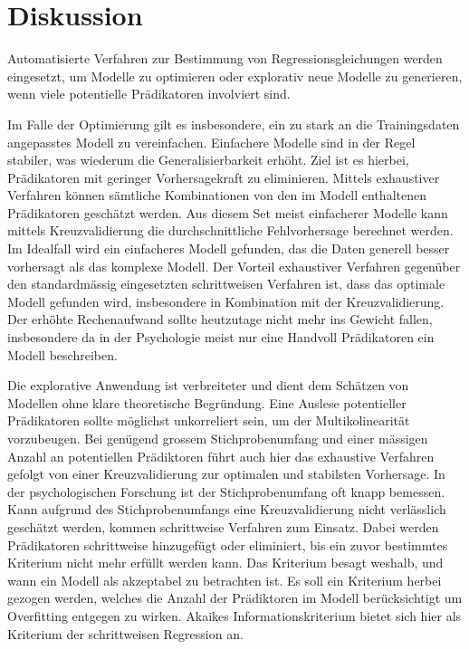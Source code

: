 \section{Diskussion}
Automatisierte Verfahren zur Bestimmung von Regressionsgleichungen werden eingesetzt, um Modelle zu optimieren oder explorativ neue Modelle zu generieren, wenn viele potentielle Prädikatoren involviert sind. 

Im Falle der Optimierung gilt es insbesondere, ein zu stark an die Trainingsdaten angepasstes Modell zu vereinfachen. 
Einfachere Modelle sind in der Regel stabiler, was wiederum die Generalisierbarkeit erhöht.
Ziel ist es hierbei, Prädikatoren mit geringer Vorhersagekraft zu eliminieren. Mittels exhaustiver Verfahren können sämtliche Kombinationen von den im Modell enthaltenen Prädikatoren geschätzt werden.
Aus diesem Set meist einfacherer Modelle kann mittels Kreuzvalidierung die durchschnittliche Fehlvorhersage berechnet werden. Im Idealfall wird ein einfacheres Modell gefunden, das die Daten generell besser vorhersagt als das komplexe Modell.
Der Vorteil exhaustiver Verfahren gegenüber den standardmässig eingesetzten schrittweisen Verfahren ist, dass das optimale Modell gefunden wird, insbesondere in Kombination mit der Kreuzvalidierung.
Der erhöhte Rechenaufwand sollte heutzutage nicht mehr ins Gewicht fallen, insbesondere da in der Psychologie meist nur eine Handvoll Prädikatoren ein Modell beschreiben.  

Die explorative Anwendung ist verbreiteter und dient dem Schätzen von Modellen ohne klare theoretische Begründung.
Eine Auslese potentieller Prädikatoren sollte möglichst unkorreliert sein, um der Multikolinearität vorzubeugen. Bei genügend grossem Stichprobenumfang und einer mässigen Anzahl an potentiellen Prädiktoren führt auch hier das exhaustive Verfahren gefolgt von einer Kreuzvalidierung zur optimalen und stabilsten Vorhersage. In der psychologischen Forschung ist der Stichprobenumfang oft knapp bemessen. Kann aufgrund des Stichprobenumfangs eine Kreuzvalidierung nicht verlässlich geschätzt werden, kommen schrittweise Verfahren zum Einsatz. Dabei werden Prädikatoren schrittweise hinzugefügt oder eliminiert, bis ein zuvor bestimmtes Kriterium nicht mehr erfüllt werden kann. Das Kriterium  besagt weshalb, und wann ein Modell als akzeptabel zu betrachten ist.
Es soll ein Kriterium herbei gezogen werden, welches die Anzahl der Prädiktoren im Modell berücksichtigt um Overfitting entgegen zu wirken.
Akaikes Informationskriterium bietet sich hier als Kriterium  der schrittweisen Regression an.  

